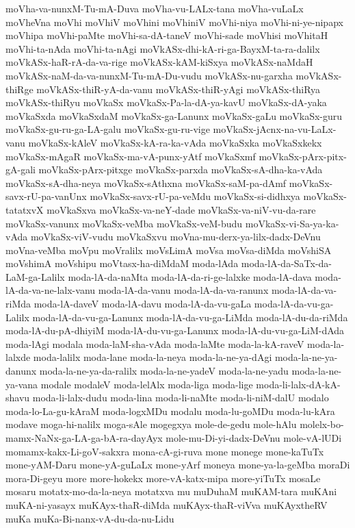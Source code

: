 {moVha-va-nunxM-Tu-mA-Duva
moVha-vu-LALx-tana
moVha-vuLaLx
moVheVna
moVhi
moVhiV
moVhini
moVhiniV
moVhi-niya
moVhi-ni-ye-nipapx
moVhipa
moVhi-paMte
moVhi-sa-dA-taneV
moVhi-sade
moVhisi
moVhitaH
moVhi-ta-nAda
moVhi-ta-nAgi
moVkASx-dhi-kA-ri-ga-BayxM-ta-ra-dalilx
moVkASx-haR-rA-da-va-rige
moVkASx-kAM-kiSxya
moVkASx-naMdaH
moVkASx-naM-da-va-nunxM-Tu-mA-Du-vudu
moVkASx-nu-garxha
moVkASx-thiRge
moVkASx-thiR-yA-da-vanu
moVkASx-thiR-yAgi
moVkASx-thiRya
moVkASx-thiRyu
moVkaSx
moVkaSx-Pa-la-dA-ya-kavU
moVkaSx-dA-yaka
moVkaSxda
moVkaSxdaM
moVkaSx-ga-Lanunx
moVkaSx-gaLu
moVkaSx-guru
moVkaSx-gu-ru-ga-LA-galu
moVkaSx-gu-ru-vige
moVkaSx-jAcnx-na-vu-LaLx-vanu
moVkaSx-kAleV
moVkaSx-kA-ra-ka-vAda
moVkaSxka
moVkaSxkekx
moVkaSx-mAgaR
moVkaSx-ma-vA-punx-yAtf
moVkaSxmf
moVkaSx-pArx-pitx-gA-gali
moVkaSx-pArx-pitxge
moVkaSx-parxda
moVkaSx-sA-dha-ka-vAda
moVkaSx-sA-dha-neya
moVkaSx-sAthxna
moVkaSx-saM-pa-dAmf
moVkaSx-savx-rU-pa-vanUnx
moVkaSx-savx-rU-pa-veMdu
moVkaSx-si-didhxya
moVkaSx-tatatxvX
moVkaSxva
moVkaSx-va-neY-dade
moVkaSx-va-niV-vu-da-rare
moVkaSx-vanunx
moVkaSx-veMba
moVkaSx-veM-budu
moVkaSx-vi-Sa-ya-ka-vAda
moVkaSx-viV-vudu
moVkaSxvu
moVna-mu-derx-ya-lilx-dadx-DeVnu
moVna-veMba
moVpu
moVralilx
moVsLimA
moVsa
moVsa-diMda
moVshiSA
moVshimA
moVshipu
moVtasx-ha-diMdaM
moda-lAda
moda-lA-da-SaTx-da-LaM-ga-Lalilx
moda-lA-da-naMta
moda-lA-da-ri-ge-lalxke
moda-lA-dava
moda-lA-da-va-ne-lalx-vanu
moda-lA-da-vanu
moda-lA-da-va-ranunx
moda-lA-da-va-riMda
moda-lA-daveV
moda-lA-davu
moda-lA-da-vu-gaLa
moda-lA-da-vu-ga-Lalilx
moda-lA-da-vu-ga-Lanunx
moda-lA-da-vu-ga-LiMda
moda-lA-du-da-riMda
moda-lA-du-pA-dhiyiM
moda-lA-du-vu-ga-Lanunx
moda-lA-du-vu-ga-LiM-dAda
moda-lAgi
modala
moda-laM-sha-vAda
moda-laMte
moda-la-kA-raveV
moda-la-lalxde
moda-lalilx
moda-lane
moda-la-neya
moda-la-ne-ya-dAgi
moda-la-ne-ya-danunx
moda-la-ne-ya-da-ralilx
moda-la-ne-yadeV
moda-la-ne-yadu
moda-la-ne-ya-vana
modale
modaleV
moda-lelAlx
moda-liga
moda-lige
moda-li-lalx-dA-kA-shavu
moda-li-lalx-dudu
moda-lina
moda-li-naMte
moda-li-niM-dalU
modalo
moda-lo-La-gu-kAraM
moda-logxMDu
modalu
moda-lu-goMDu
moda-lu-kAra
modave
moga-hi-nalilx
moga-sAle
mogegxya
mole-de-gedu
mole-hAlu
molelx-bo-mamx-NaNx-ga-LA-ga-bA-ra-dayAyx
mole-mu-Di-yi-dadx-DeVnu
mole-vA-lUDi
momamx-kakx-Li-goV-sakxra
mona-cA-gi-ruva
mone
monege
mone-kaTuTx
mone-yAM-Daru
mone-yA-guLaLx
mone-yArf
moneya
mone-ya-la-geMba
moraDi
mora-Di-geyu
more
more-hokekx
more-vA-katx-mipa
more-yiTuTx
mosaLe
mosaru
motatx-mo-da-la-neya
motatxva
mu
muDuhaM
muKAM-tara
muKAni
muKA-ni-yasayx
muKAyx-thaR-diMda
muKAyx-thaR-viVva
muKAyxtheRV
muKa
muKa-Bi-nanx-vA-du-da-nu-Lidu
}
